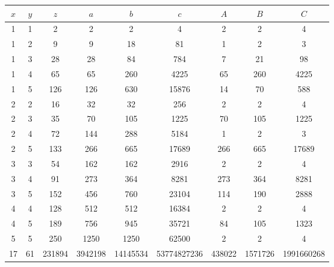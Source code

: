 \documentclass[12pt]{article}
\begin{document}
\begin{center}
    \begin{tabular}{c|c|c||c|c|c||c|c|c}\label{ye}
        $x$ & $y$ & $z$ & $a$ & $b$ & $c$ & $A$ & $B$ & $C$ \\
        \hline
        1 & 1 & 2   & 2     & 2     & 4     &\cellcolor{gray!25} 2      &\cellcolor{gray!25} 2  &\cellcolor{gray!25} 4 \\
        1 & 2 & 9   & 9     & 18    & 81    &\cellcolor{gray!25} 1      &\cellcolor{gray!25} 2  &\cellcolor{gray!25} 3 \\
        1 & 3 & 28  & 28    & 84    & 784   &\cellcolor{gray!25} 7      &\cellcolor{gray!25} 21 &\cellcolor{gray!25} 98 \\
        1 & 4 & 65  & 65    & 260   & 4225  &\cellcolor{gray!25} 65     &\cellcolor{gray!25}260 &\cellcolor{gray!25} 4225 \\
        1 & 5 & 126 & 126   & 630   & 15876 &\cellcolor{gray!25} 14     &\cellcolor{gray!25} 70 &\cellcolor{gray!25} 588 \\
        2 & 2 & 16  & 32    & 32    & 256   & 2     & 2     & 4 \\
        2 & 3 & 35  & 70    & 105   & 1225  &\cellcolor{gray!25} 70     &\cellcolor{gray!25} 105&\cellcolor{gray!25} 1225 \\
        2 & 4 & 72  & 144   & 288   & 5184  & 1     & 2     & 3 \\
        2 & 5 & 133 & 266   & 665   & 17689 &\cellcolor{gray!25} 266    &\cellcolor{gray!25} 665&\cellcolor{gray!25} 17689 \\
        3 & 3 & 54  & 162   & 162   & 2916  & 2     & 2     & 4 \\
        3 & 4 & 91  & 273   & 364   & 8281  &\cellcolor{gray!25} 273    &\cellcolor{gray!25} 364&\cellcolor{gray!25} 8281 \\
        3 & 5 & 152 & 456   & 760   & 23104 &\cellcolor{gray!25} 114    &\cellcolor{gray!25} 190&\cellcolor{gray!25} 2888 \\
        4 & 4 & 128 & 512   & 512   & 16384 & 2     & 2     & 4 \\
        4 & 5 & 189 & 756   & 945   & 35721 &\cellcolor{gray!25} 84     &\cellcolor{gray!25} 105&\cellcolor{gray!25} 1323 \\
        5 & 5 & 250 & 1250  & 1250  & 62500 & 2     & 2     & 4 \\
        17 & 61 & 231894 & 3942198 & 14145534 & 53774827236 &\cellcolor{gray!25} 438022 &\cellcolor{gray!25} 1571726 &\cellcolor{gray!25} 1991660268 \\
    \end{tabular}
\end{center}
\end{document}
